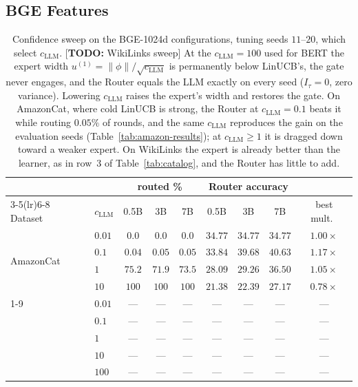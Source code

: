 \documentclass[anon]{alt2027} %
\newcommand{\todo}[1]{\textcolor{red!70!black}{[\textbf{TODO:} #1]}}
\begin{document}
\subsection{BGE Features}
\label{app:bge}

\begin{table}[h]
\centering
\caption{Confidence sweep on the BGE-1024d configurations, tuning seeds
$11$--$20$, which select $c_{\mathrm{LLM}}$. \todo{WikiLinks sweep} At the
$c_{\mathrm{LLM}}=100$ used for BERT the expert width $u^{(1)}=\|\phi\|/\sqrt{c_{\mathrm{LLM}}}$ is
permanently below LinUCB's, the gate never engages, and the Router equals the
LLM exactly on every seed ($I_\tau=0$, zero variance). Lowering $c_{\mathrm{LLM}}$ raises the
expert's width and restores the gate. On AmazonCat, where cold LinUCB is
strong, the Router at $c_{\mathrm{LLM}}=0.1$ beats it while routing $0.05\%$ of rounds, and
the same $c_{\mathrm{LLM}}$ reproduces the gain on the evaluation seeds
(Table~\ref{tab:amazon-results}); at $c_{\mathrm{LLM}}\ge1$ it is dragged down toward a
weaker expert. On WikiLinks the expert is
already better than the learner, as in row~3 of Table~\ref{tab:catalog}, and the
Router has little to add.}
\label{tab:bge-csweep}
\scriptsize
\setlength{\tabcolsep}{4pt}
\begin{tabular}{@{}llccccccc@{}}
\toprule
& & \multicolumn{3}{c}{routed \%} & \multicolumn{3}{c}{Router accuracy} & \\
\cmidrule(lr){3-5}\cmidrule(lr){6-8}
Dataset & $c_{\mathrm{LLM}}$ & 0.5B & 3B & 7B & 0.5B & 3B & 7B & best mult.\ \\
\midrule
\multirow{4}{*}{AmazonCat} & $0.01$ & $0.0$ & $0.0$ & $0.0$ & $34.77$ & $34.77$ & $34.77$ & $1.00\times$ \\
 & $\mathbf{0.1}$ & $0.04$ & $0.05$ & $0.05$ & $33.84$ & $39.68$ & $\mathbf{40.63}$ & $\mathbf{1.17\times}$ \\
 & $1$  & $75.2$ & $71.9$ & $73.5$ & $28.09$ & $29.26$ & $36.50$ & $1.05\times$ \\
 & $10$ & $100$ & $100$ & $100$ & $21.38$ & $22.39$ & $27.17$ & $0.78\times$ \\
\cmidrule(lr){1-9}
\multirow{5}{*}{WikiLinks} & $0.01$ & --- & --- & --- & --- & --- & --- & --- \\
 & $0.1$ & --- & --- & --- & --- & --- & --- & --- \\
 & $1$  & --- & --- & --- & --- & --- & --- & --- \\
 & $10$ & --- & --- & --- & --- & --- & --- & --- \\
 & $100$ & --- & --- & --- & --- & --- & --- & --- \\
\bottomrule
\end{tabular}
\end{table}
\end{document}
